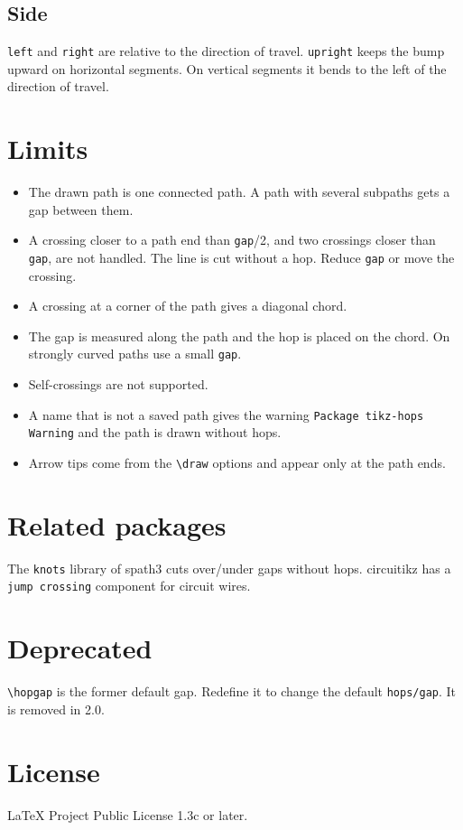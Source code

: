 \documentclass[a4paper]{article}
\newcommand\key[1]{\texttt{#1}}
\newcommand\pkg[1]{\textsf{#1}}
\newenvironment{example}
  {\VerbatimOut{\jobname.ex}}
  {\endVerbatimOut\par\medskip\noindent
   \VerbatimInput[frame=single,fontsize=\small]{\jobname.ex}\par\smallskip
   \noindent\par\medskip}
\begin{document}
\subsection{Side}
\key{left} and \key{right} are relative to the direction of travel.
\key{upright} keeps the bump upward on horizontal segments. On vertical
segments it bends to the left of the direction of travel.

\begin{example}
\end{example}

\section{Limits}
\begin{itemize}
\item The drawn path is one connected path. A path with several subpaths gets
  a gap between them.
\item A crossing closer to a path end than \key{gap}/2, and two crossings
  closer than \key{gap}, are not handled. The line is cut without a hop.
  Reduce \key{gap} or move the crossing.
\item A crossing at a corner of the path gives a diagonal chord.
\item The gap is measured along the path and the hop is placed on the chord.
  On strongly curved paths use a small \key{gap}.
\item Self-crossings are not supported.
\item A name that is not a saved path gives the warning
  \texttt{Package tikz-hops Warning} and the path is drawn without hops.
\item Arrow tips come from the \verb|\draw| options and appear only at the path ends.
\end{itemize}

\section{Related packages}
The \texttt{knots} library of \pkg{spath3} cuts over/under gaps without hops.
\pkg{circuitikz} has a \texttt{jump crossing} component for circuit wires.

\section{Deprecated}
\verb|\hopgap| is the former default gap. Redefine it to change the default
\key{hops/gap}. It is removed in 2.0.

\section{License}
LaTeX Project Public License 1.3c or later.
\end{document}
